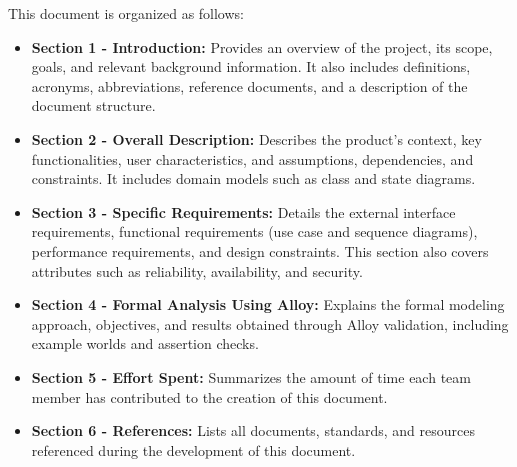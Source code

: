 This document is organized as follows:
\begin{itemize}
    \item \textbf{Section 1 - Introduction:} Provides an overview of the project, its scope, goals, and relevant background information. It also includes definitions, acronyms, abbreviations, reference documents, and a description of the document structure.
    \item \textbf{Section 2 - Overall Description:} Describes the product's context, key functionalities, user characteristics, and assumptions, dependencies, and constraints. It includes domain models such as class and state diagrams.
    \item \textbf{Section 3 - Specific Requirements:} Details the external interface requirements, functional requirements (use case and sequence diagrams), performance requirements, and design constraints. This section also covers attributes such as reliability, availability, and security.
    \item \textbf{Section 4 - Formal Analysis Using Alloy:} Explains the formal modeling approach, objectives, and results obtained through Alloy validation, including example worlds and assertion checks.
    \item \textbf{Section 5 - Effort Spent:} Summarizes the amount of time each team member has contributed to the creation of this document.
    \item \textbf{Section 6 - References:} Lists all documents, standards, and resources referenced during the development of this document.
\end{itemize}

